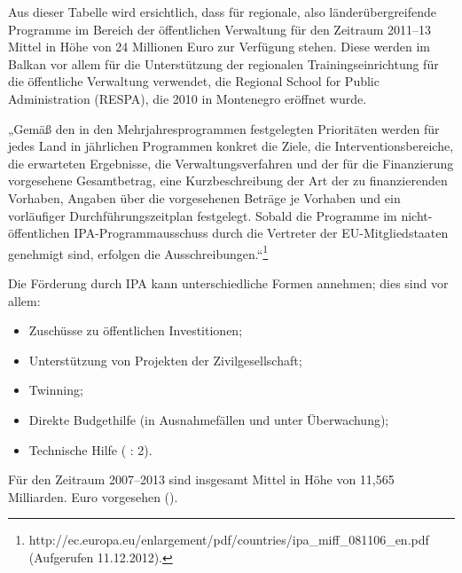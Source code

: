 Aus dieser Tabelle wird ersichtlich, dass für regionale, also länderübergreifende Programme im Bereich der öffentlichen Verwaltung für den Zeitraum 2011–13 Mittel in Höhe von 24 Millionen Euro zur Verfügung stehen. Diese werden im Balkan vor allem für die Unterstützung der regionalen Trainingseinrichtung für die öffentliche Verwaltung verwendet, die Regional School for Public Administration (RESPA), die 2010 in Montenegro eröffnet wurde.\par

„Gemäß den in den Mehrjahresprogrammen festgelegten Prioritäten werden für jedes Land in jährlichen Programmen konkret die Ziele, die Interventionsbereiche, die erwarteten Ergebnisse, die Verwaltungsverfahren und der für die Finanzierung vorgesehene Gesamtbetrag, eine Kurzbeschreibung der Art der zu finanzierenden Vorhaben, Angaben über die vorgesehenen Beträge je Vorhaben und ein vorläufiger Durchführungszeitplan festgelegt. Sobald die Programme im nicht-öffentlichen IPA-Programmausschuss durch die Vertreter der EU-Mitgliedstaaten genehmigt sind, erfolgen die Ausschreibungen.“\footnote{http://ec.europa.eu/enlargement/pdf/countries/ipa\_miff\_081106\_en.pdf (Aufgerufen 11.12.2012).}

Die Förderung durch IPA kann unterschiedliche Formen annehmen; dies sind vor allem:
\begin{itemize} \itemsep1pt \parskip0pt 
\item Zuschüsse zu öffentlichen Investitionen;
\item Unterstützung von Projekten der Zivilgesellschaft;
\item Twinning;
\item Direkte Budgethilfe (in Ausnahmefällen und unter Überwachung);
\item Technische Hilfe (\cite{epec11} : 2).
\end{itemize}
Für den Zeitraum 2007–2013 sind insgesamt Mittel in Höhe von 11,565 Milliarden. Euro vorgesehen (\cite{senatskanzlei}).\par


